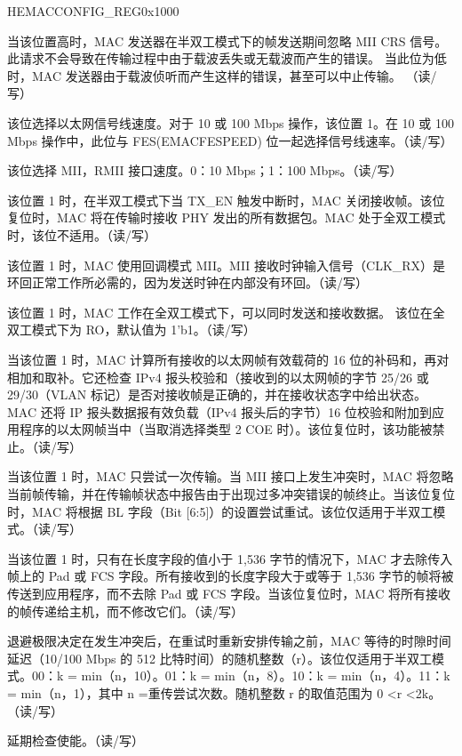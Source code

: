 \begin{register}{H}{EMACCONFIG\_REG}{0x1000}
\begin{regdesc}\begin{reglist}
\item[继上一页寄存器描述。]
\item [EMACDISABLECRS]当该位置高时，MAC 发送器在半双工模式下的帧发送期间忽略 MII CRS 信号。 此请求不会导致在传输过程中由于载波丢失或无载波而产生的错误。 当此位为低时，MAC 发送器由于载波侦听而产生这样的错误，甚至可以中止传输。 （读/写）
\item [EMACMII] 该位选择以太网信号线速度。对于 10 或 100 Mbps 操作，该位置 1。在 10 或 100 Mbps 操作中，此位与 FES(EMACFESPEED) 位一起选择信号线速率。（读/写）
\item [EMACFESPEED] 该位选择 MII，RMII 接口速度。0：10 Mbps；1：100 Mbps。（读/写）
\item [EMACRXOWN]该位置 1 时，在半双工模式下当 TX\_EN 触发中断时，MAC 关闭接收帧。该位复位时，MAC 将在传输时接收 PHY 发出的所有数据包。MAC 处于全双工模式时，该位不适用。（读/写）
\item [EMACLOOPBACK]该位置 1 时，MAC 使用回调模式 MII。MII 接收时钟输入信号（CLK\_RX）是环回正常工作所必需的，因为发送时钟在内部没有环回。（读/写）
\item [EMACDUPLEX]该位置 1 时，MAC 工作在全双工模式下，可以同时发送和接收数据。 该位在全双工模式下为 RO，默认值为 1'b1。（读/写）
\item [EMACRXIPCOFFLOAD]
当该位置 1 时，MAC 计算所有接收的以太网帧有效载荷的 16 位的补码和，再对相加和取补。它还检查 IPv4 报头校验和（接收到的以太网帧的字节 25/26 或 29/30（VLAN 标记）是否对接收帧是正确的，并在接收状态字中给出状态。MAC 还将 IP 报头数据报有效负载（IPv4 报头后的字节）16 位校验和附加到应用程序的以太网帧当中（当取消选择类型 2 COE 时）。该位复位时，该功能被禁止。（读/写）
\item [EMACRETRY]当该位置 1 时，MAC 只尝试一次传输。当 MII 接口上发生冲突时，MAC 将忽略当前帧传输，并在传输帧状态中报告由于出现过多冲突错误的帧终止。当该位复位时，MAC 将根据 BL 字段（Bit [6:5]）的设置尝试重试。该位仅适用于半双工模式。（读/写）
\item [EMACPADCRCSTRIP]
当该位置 1 时，只有在长度字段的值小于 1,536 字节的情况下，MAC 才去除传入帧上的 Pad 或 FCS 字段。所有接收到的长度字段大于或等于 1,536 字节的帧将被传送到应用程序，而不去除 Pad 或 FCS 字段。当该位复位时，MAC 将所有接收的帧传递给主机，而不修改它们。（读/写）
\item [EMACBACKOFFLIMIT]
退避极限决定在发生冲突后，在重试时重新安排传输之前，MAC 等待的时隙时间延迟（10/100 Mbps 的 512 比特时间）的随机整数（r）。该位仅适用于半双工模式。00：k = min（n，10）。01：k = min（n，8）。10：k = min（n，4）。11：k = min（n，1），其中 n =重传尝试次数。随机整数 r 的取值范围为 0 <r <2k。（读/写）
\item [EMACDEFERRALCHECK]延期检查使能。（读/写）
\item[寄存器描述下一页继续。]
\end{reglist}\end{regdesc}
\end{register}
